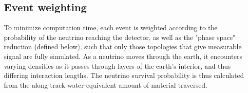 

\subsection{Event weighting}
\label{sec:weights}
To minimize computation time,
each event is weighted according to the probability of the neutrino reaching the detector, as well as
the "phase space" reduction (defined below), such that only those topologies that give measurable signal are fully simulated. 
As a neutrino moves through the earth, it encounters varying
densities as it passes through layers of the earth's interior,
and thus differing interaction lengths. 
The neutrino survival probability is thus calculated from the along-track
water-equivalent amount of material traversed.

